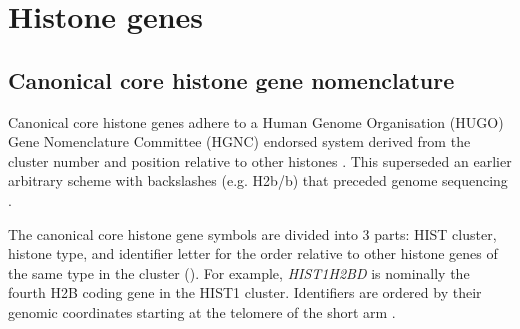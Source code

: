 \section{Histone genes}

  \subsection{Canonical core histone gene nomenclature}
    Canonical core histone genes adhere to a Human Genome Organisation (HUGO)
    Gene Nomenclature Committee (HGNC)
    endorsed system derived from the cluster number and position relative
    to other histones \citep{Marzluff02}.
    This superseded an earlier arbitrary scheme with backslashes (e.g. H2b/b)
    that preceded genome sequencing \citep{AlbigGenomics1997,AlbigHumangen1997}.

    The canonical core histone gene symbols are divided into 3 parts:
    HIST cluster, histone type, and identifier letter
    for the order relative to other histone genes of the same type in
    the cluster ().
    For example, \textit{HIST1H2BD} is nominally the fourth H2B coding gene in the HIST1 cluster.
    Identifiers are ordered by their genomic coordinates starting at
    the telomere of the short arm \citep{Marzluff02}.


